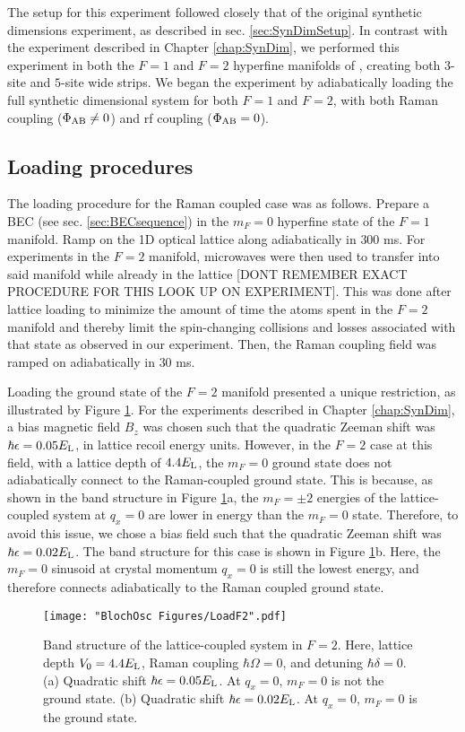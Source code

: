 The setup for this experiment followed closely that of the original synthetic dimensions experiment, as described in sec. \ref{sec:SynDimSetup}. In contrast with the experiment described in Chapter \ref{chap:SynDim}, we performed this experiment in both the $F=1$ and $F=2$ hyperfine manifolds of \Rb{}, creating both $3$-site and $5$-site wide strips. We began the experiment by adiabatically loading the full synthetic dimensional system for both $F=1$ and $F=2$, with both Raman coupling ($\Phi_{\rm AB}\neq0$) and rf coupling ($\Phi_{\rm AB}=0$). 

\subsection{Loading procedures}
The loading procedure for the Raman coupled case was  as follows. Prepare a \Rb{} BEC (see sec. \ref{sec:BECsequence}) in the $m_F=0$ hyperfine state of the $F=1$ manifold. Ramp on the 1D optical lattice along \ex{} adiabatically in $300$ ms. For experiments in the $F=2$ manifold, microwaves were then used to transfer into said manifold while already in the lattice [DONT REMEMBER EXACT PROCEDURE FOR THIS LOOK UP ON EXPERIMENT]. This was done after lattice loading to minimize the amount of time the atoms spent in the $F=2$ manifold and thereby limit the spin-changing collisions and losses associated with that state as observed in our experiment.   Then, the Raman coupling field was ramped on adiabatically in $30$ ms.

Loading the ground state of the $F=2$ manifold presented a unique restriction, as illustrated by Figure \ref{fig:LoadF2}. For the experiments described in Chapter \ref{chap:SynDim}, a bias magnetic field $B_z$ was chosen such that the quadratic Zeeman shift was $\hbar\epsilon = 0.05 E_{\rm L}$, in lattice recoil energy units. However, in the $F=2$ case at this field, with a lattice depth of $4.4 E_{\rm L}$, the $m_F=0$ ground state does not adiabatically connect to the Raman-coupled ground state. This is because, as shown in the band structure in Figure \ref{fig:LoadF2}a, the $m_F=\pm2$ energies of the lattice-coupled system at $q_x=0$ are lower in energy than the $m_F=0$ state. Therefore, to avoid this issue, we chose a bias field such that the quadratic Zeeman shift was $\hbar\epsilon = 0.02 E_{\rm L}$. The band structure for this case is shown in Figure \ref{fig:LoadF2}b. Here, the $m_F=0$ sinusoid at crystal momentum $q_x=0$ is still the lowest energy, and therefore connects adiabatically to the Raman coupled ground state. 
\begin{figure}
\texttt{[image: "BlochOsc Figures/LoadF2".pdf]}
\caption[Band structure of the lattice-coupled system in $F=2$]{Band structure of the lattice-coupled system in $F=2$. Here, lattice depth $V_0=4.4 E_{\rm L}$, Raman coupling $\hbar\Omega=0$, and detuning $\hbar\delta=0$. (a) Quadratic shift $\hbar\epsilon=0.05 E_{\rm L}$. At $q_x=0$, $m_F=0$ is not the ground state. (b) Quadratic shift $\hbar\epsilon = 0.02 E_{\rm L}$.  At $q_x=0$, $m_F=0$ is the ground state.}
\label{fig:LoadF2}
\end{figure}


